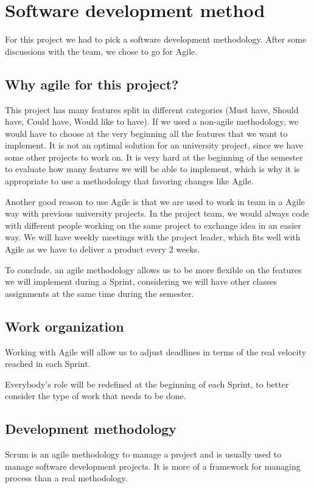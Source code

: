 \section{Software development method}

For this project we had to pick a software development methodology. After some discussions with the team, we chose to go for Agile.

\subsection{Why agile for this project?}

This project has many features split in different categories (Must have, Should have, Could have, Would like to have). If we used a non-agile methodology, we would have to choose at the very beginning all the features that we want to implement.
It is not an optimal solution for an university project, since we have some other projects to work on. It is very hard at the beginning of the semester to evaluate how many features we will be able to implement, which is why it is appropriate to use a methodology that favoring changes like Agile.\newline

Another good reason to use Agile is that we are used to work in team in a Agile way with previous university projects. In the project team, we would always code with different people working on the same project to exchange idea in an easier way.
We will have weekly meetings with the project leader, which fits well with Agile as we have to deliver a product every 2 weeks.\newline

To conclude, an agile methodology allows us to be more flexible on the features we will implement during a Sprint, considering we will have other classes assignments at the same time during the semester.

\subsection{Work organization}
Working with Agile will allow us to adjust deadlines in terms of the real velocity reached in each Sprint.\newline

Everybody's role will be redefined at the beginning of each Sprint, to better consider the type of work that needs to be done.


\subsection{Development methodology}
Scrum is an agile methodology to manage a project and is usually used to manage software development projects. It is more of a framework for managing process than a real methodology.\newline

